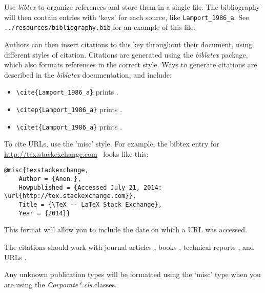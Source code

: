 Use \emph{bibtex} to organize references and store them in a single file. The bibliography will then contain entries with `keys' for each source, like \texttt{Lamport\_1986\_a}. See \verb+../resources/bibliography.bib+ for an example of this file. 

Authors can then insert citations to this key throughout their document, using different styles of citation. Citations are generated using the \emph{biblatex} package, which also formats references in the correct style.  Ways to generate citations are described in the \emph{biblatex} documentation, and include:
\begin{itemize}
\item \verb+\cite{Lamport_1986_a}+ prints \cite{Lamport_1986_a}.
\item \verb+\citep{Lamport_1986_a}+ prints \citep{Lamport_1986_a}.
\item \verb+\citet{Lamport_1986_a}+ prints \citet{Lamport_1986_a}.
\end{itemize}

To cite URLs, use the 'misc' style. For example, the bibtex entry for \href{http://tex.stackexchange.com}{http://tex.stackexchange.com}\ \citep{texstackexchange} looks like this:

\begin{lstlisting}[language={[LaTeX]Tex}]
@misc{texstackexchange,
	Author = {Anon.},
	Howpublished = {Accessed July 21, 2014: \url{http://tex.stackexchange.com}},
	Title = {\TeX -- LaTeX Stack Exchange},
	Year = {2014}}
\end{lstlisting}

This format will allow you to include the date on which a URL was accessed.

The citations should work with journal articles \citep{Paskin_1999_a}, books \citep{Knuth_1984_a, Lamport_1986_a, Paskin_1999_a}, technical reports \citep{TechReportTest}, and URLs \citep{texstackexchange}. 

Any unknown publication types will be formatted using the `misc' type when you are using the \emph{Corporate*.cls} classes.
